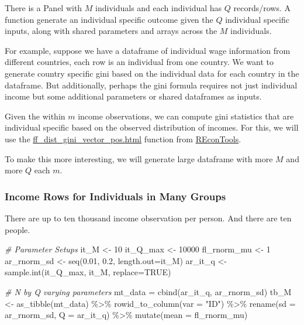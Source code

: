 \documentclass[
]{book}
\newenvironment{Shaded}{\begin{snugshade}}{\end{snugshade}}
\newcommand{\AttributeTok}[1]{\textcolor[rgb]{0.77,0.63,0.00}{#1}}
\newcommand{\CommentTok}[1]{\textcolor[rgb]{0.56,0.35,0.01}{\textit{#1}}}
\newcommand{\ConstantTok}[1]{\textcolor[rgb]{0.00,0.00,0.00}{#1}}
\newcommand{\DecValTok}[1]{\textcolor[rgb]{0.00,0.00,0.81}{#1}}
\newcommand{\FloatTok}[1]{\textcolor[rgb]{0.00,0.00,0.81}{#1}}
\newcommand{\FunctionTok}[1]{\textcolor[rgb]{0.00,0.00,0.00}{#1}}
\newcommand{\NormalTok}[1]{#1}
\newcommand{\OtherTok}[1]{\textcolor[rgb]{0.56,0.35,0.01}{#1}}
\newcommand{\SpecialCharTok}[1]{\textcolor[rgb]{0.00,0.00,0.00}{#1}}
\newcommand{\StringTok}[1]{\textcolor[rgb]{0.31,0.60,0.02}{#1}}
\begin{document}
There is a Panel with \(M\) individuals and each individual has \(Q\) records/rows. A function generate an individual specific outcome given the \(Q\) individual specific inputs, along with shared parameters and arrays across the \(M\) individuals.

For example, suppose we have a dataframe of individual wage information from different countries, each row is an individual from one country. We want to generate country specific gini based on the individual data for each country in the dataframe. But additionally, perhaps the gini formula requires not just individual income but some additional parameters or shared dataframes as inputs.

Given the within \(m\) income observations, we can compute gini statistics that are individual specific based on the observed distribution of incomes. For this, we will use the \href{https://fanwangecon.github.io/REconTools/reference/ff_dist_gini_vector_pos.html}{ff\_dist\_gini\_vector\_pos.html} function from \href{https://fanwangecon.github.io/REconTools/}{REconTools}.

To make this more interesting, we will generate large dataframe with more \(M\) and more \(Q\) each \(m\).

\hypertarget{income-rows-for-individuals-in-many-groups}{%
\subsubsection{Income Rows for Individuals in Many Groups}\label{income-rows-for-individuals-in-many-groups}}

There are up to ten thousand income observation per person. And there are ten people.

\begin{Shaded}
\begin{Highlighting}[]
\CommentTok{\# Parameter Setups}
\NormalTok{it\_M }\OtherTok{\textless{}{-}} \DecValTok{10}
\NormalTok{it\_Q\_max }\OtherTok{\textless{}{-}} \DecValTok{10000}
\NormalTok{fl\_rnorm\_mu }\OtherTok{\textless{}{-}} \DecValTok{1}
\NormalTok{ar\_rnorm\_sd }\OtherTok{\textless{}{-}} \FunctionTok{seq}\NormalTok{(}\FloatTok{0.01}\NormalTok{, }\FloatTok{0.2}\NormalTok{, }\AttributeTok{length.out=}\NormalTok{it\_M)}
\NormalTok{ar\_it\_q }\OtherTok{\textless{}{-}} \FunctionTok{sample.int}\NormalTok{(it\_Q\_max, it\_M, }\AttributeTok{replace=}\ConstantTok{TRUE}\NormalTok{)}

\CommentTok{\# N by Q varying parameters}
\NormalTok{mt\_data }\OtherTok{=} \FunctionTok{cbind}\NormalTok{(ar\_it\_q, ar\_rnorm\_sd)}
\NormalTok{tb\_M }\OtherTok{\textless{}{-}} \FunctionTok{as\_tibble}\NormalTok{(mt\_data) }\SpecialCharTok{\%\textgreater{}\%} \FunctionTok{rowid\_to\_column}\NormalTok{(}\AttributeTok{var =} \StringTok{"ID"}\NormalTok{) }\SpecialCharTok{\%\textgreater{}\%}
                \FunctionTok{rename}\NormalTok{(}\AttributeTok{sd =}\NormalTok{ ar\_rnorm\_sd, }\AttributeTok{Q =}\NormalTok{ ar\_it\_q) }\SpecialCharTok{\%\textgreater{}\%}
                \FunctionTok{mutate}\NormalTok{(}\AttributeTok{mean =}\NormalTok{ fl\_rnorm\_mu)}
\end{Highlighting}
\end{Shaded}
\end{document}
